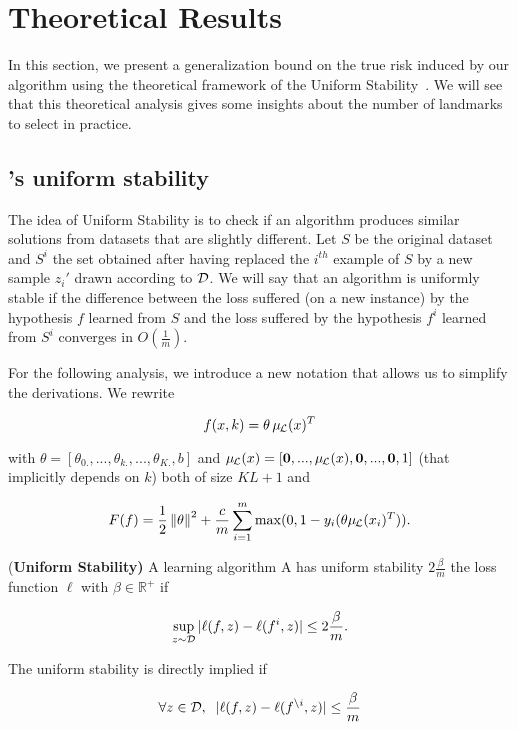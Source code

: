 \section{Theoretical Results}
\label{sec:stability}

In this section, we present a generalization bound on the true risk induced by our algorithm using the theoretical framework of the Uniform Stability~\cite{bousquet2002stability}.
We will see that this theoretical analysis gives some insights about the number of landmarks to select in practice. 

\subsection{\landSVM's uniform stability}

The idea of Uniform Stability is to check if an algorithm produces similar solutions from datasets that are slightly different. Let $S$ be the original dataset and $S^i$ the set obtained after having replaced the $i^{th}$ example of $S$ by a new sample $z_i'$ drawn according to ${\cal D}$.
We will say that an algorithm is uniformly stable if the difference between the loss suffered (on a new instance) by the hypothesis $f$ learned from $S$ and the loss suffered by the hypothesis $f^i$ learned from $S^i$ converges in $O(\frac 1m)$.

For the following analysis, we introduce a new notation that allows us to simplify the derivations. We rewrite

$$ f(x,k) = \theta \, \mul{x}^T $$

with $\theta = [\theta_{0.},...,\theta_{k.},...,\theta_{K.},b]$ and $\mul{x} = [\bm{0},...,\mul{x},\bm{0},...,\bm{0},1]$ (that implicitly depends on $k$) both of size $KL+1$ and

$$ F(f) = \frac{1}{2} \norm{\theta}^2 + \frac{c}{m}\sumi \max(0,1-y_i (\theta \mul{x_i}^T)).$$

\begin{defn}{(\bf{Uniform Stability})}
    A learning algorithm A has uniform stability $2 \frac{\beta}{m}$ \wrt the loss function $\ell$ with $\beta \in \mathbb{R}^{+}$ if

    $$ \sup_{z \sim \mathcal{D}} | \ell(f,z) - \ell(f^{i},z) | \leq 2 \frac{\beta}{m} .$$ 
\end{defn}

The uniform stability is directly implied if 

$$ \forall z \in \mathcal{D}, \;\; | \ell(f,z) - \ell(f^{\setminus i},z) | \leq \frac{\beta}{m}$$

